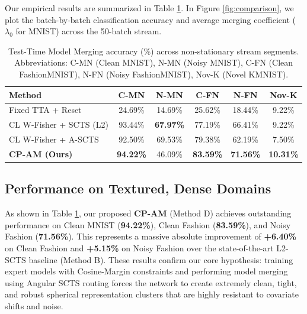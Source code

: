 \documentclass{article}
\theoremstyle{plain}
\theoremstyle{definition}
\theoremstyle{remark}
\begin{document}
Our empirical results are summarized in Table \ref{tab:results}. In Figure \ref{fig:comparison}, we plot the batch-by-batch classification accuracy and average merging coefficient ($\lambda_0$ for MNIST) across the 50-batch stream.

\begin{table}[t]
\caption{Test-Time Model Merging accuracy (\%) across non-stationary stream segments. Abbreviations: C-MN (Clean MNIST), N-MN (Noisy MNIST), C-FN (Clean FashionMNIST), N-FN (Noisy FashionMNIST), Nov-K (Novel KMNIST).}
\label{tab:results}
\vskip 0.15in
\begin{center}
\begin{small}
\begin{sc}
\begin{tabular}{lccccc}
\toprule
Method & C-MN & N-MN & C-FN & N-FN & Nov-K \\
\midrule
Fixed TTA + Reset & 24.69\% & 14.69\% & 25.62\% & 18.44\% & 9.22\% \\
CL W-Fisher + SCTS (L2) & 93.44\% & \textbf{67.97\%} & 77.19\% & 66.41\% & 9.22\% \\
CL W-Fisher + A-SCTS & 92.50\% & 69.53\% & 79.38\% & 62.19\% & 7.50\% \\
\textbf{CP-AM (Ours)} & \textbf{94.22\%} & 46.09\% & \textbf{83.59\%} & \textbf{71.56\%} & \textbf{10.31\%} \\
\bottomrule
\end{tabular}
\end{sc}
\end{small}
\end{center}
\vskip -0.1in
\end{table}

\subsection{Performance on Textured, Dense Domains}
As shown in Table \ref{tab:results}, our proposed \textbf{CP-AM} (Method D) achieves outstanding performance on Clean MNIST (\textbf{94.22\%}), Clean Fashion (\textbf{83.59\%}), and Noisy Fashion (\textbf{71.56\%}). This represents a massive absolute improvement of \textbf{+6.40\%} on Clean Fashion and \textbf{+5.15\%} on Noisy Fashion over the state-of-the-art L2-SCTS baseline (Method B). These results confirm our core hypothesis: training expert models with Cosine-Margin constraints and performing model merging using Angular SCTS routing forces the network to create extremely clean, tight, and robust spherical representation clusters that are highly resistant to covariate shifts and noise.
\end{document}
